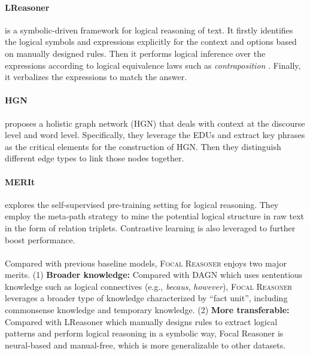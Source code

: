 \documentclass[11pt]{article}
\begin{document}
\paragraph{LReasoner} is a symbolic-driven framework for logical reasoning of text. It firstly identifies the logical symbols and expressions explicitly for the context and options based on manually designed rules. Then it performs logical inference over the expressions according to logical equivalence laws such as \textit{contraposition} \citep{russell2002artificial}. Finally, it verbalizes the expressions to match the answer.

\paragraph{HGN} proposes a holistic graph network (HGN) that deals with context at the discourse level and word level. Specifically, they leverage the EDUs and extract key phrases as the critical elements for the construction of HGN. Then they distinguish different edge types to link those nodes together.

\paragraph{MERIt} explores the self-supervised pre-training setting for logical reasoning. They employ the meta-path strategy to mine the potential logical structure in raw text in the form of relation triplets. Contrastive learning is also leveraged to further boost performance.


\paragraph{} Compared with previous baseline models, \textsc{Focal Reasoner} enjoys two major merits. (1) \textbf{Broader knowledge:} Compared with DAGN which uses sententious knowledge such as logical connectives (e.g., \textit{becaus}, \textit{however}), \textsc{Focal Reasoner} leverages a broader type of knowledge characterized by ``fact unit'', including commonsense knowledge and temporary knowledge. (2) \textbf{More transferable:} Compared with LReasoner which manually designs rules to extract logical patterns and perform logical reasoning in a symbolic way, Focal Reasoner is neural-based and manual-free, which is more generalizable to other datasets.
\end{document}
